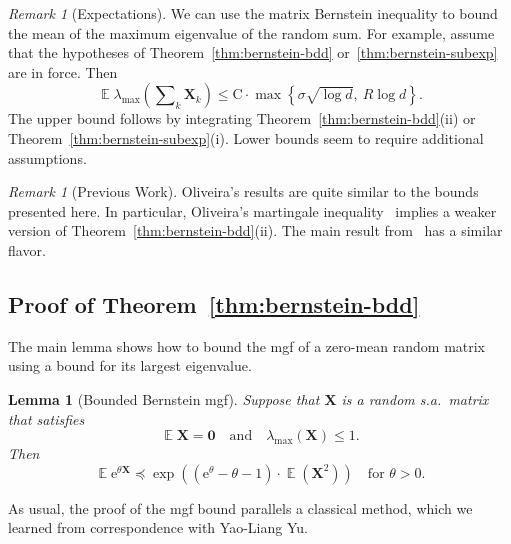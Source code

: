 \documentclass[11pt,letterpaper,twoside,reqno,draft]{amsart}
\newtheorem{lemma}[thm]{Lemma}
\theoremstyle{remark}
\newtheorem{rem}[thm]{Remark}
\numberwithin{equation}{section}
\numberwithin{thm}{section}
\begin{document}
\begin{rem}[Expectations]
We can use the matrix Bernstein inequality to bound the mean of the maximum eigenvalue of the random sum.  For example, assume that the hypotheses of Theorem~\ref{thm:bernstein-bdd} or~\ref{thm:bernstein-subexp} are in force.  Then 
\begin{equation} \label{eqn:bernstein-mean}
{\operatorname{\mathbb{E}}} \lambda_{\max}\left( \sum\nolimits_k {\bm{{X}}}_k \right)
	\leq {\mathrm{{C}}} \cdot \max\left\{ \sigma \sqrt{\log d}, \ R \log d \right\}.
\end{equation}
The upper bound follows by integrating Theorem~\ref{thm:bernstein-bdd}(ii) or Theorem~\ref{thm:bernstein-subexp}(i).  Lower bounds seem to require additional assumptions.
\end{rem}

\begin{rem}[Previous Work]

Oliveira's results are quite similar to the bounds presented here.  In particular, Oliveira's martingale inequality~\cite[Thm.~1.2]{Oli10:Concentration-Adjacency} implies a weaker version of Theorem~\ref{thm:bernstein-bdd}(ii).  The main result from~\cite{Oli10:Sums-Random} has a similar flavor.

\end{rem}

\subsection{Proof of Theorem~\ref{thm:bernstein-bdd}}

The main lemma shows how to bound the mgf of a zero-mean random matrix using a bound for its largest eigenvalue.

\begin{lemma}[Bounded Bernstein mgf] \label{lem:bernstein-bdd-mgf}
Suppose that ${\bm{{X}}}$ is a random s.a.~matrix that satisfies
$$
{\operatorname{\mathbb{E}}} {\bm{{X}}} = {\bm{{0}}}
\quad\text{and}\quad
\lambda_{\max}({\bm{{X}}}) \leq 1.
$$
Then
$$
{\operatorname{\mathbb{E}}} {\mathrm{e}}^{\theta {\bm{{X}}}}
	{\preccurlyeq} \exp\left( ({\mathrm{e}}^{\theta} - \theta - 1)
	\cdot {\operatorname{\mathbb{E}}}({\bm{{X}}}^2) \right)
\quad\text{for $\theta > 0$.}
$$
\end{lemma}

As usual, the proof of the mgf bound parallels a classical method, which we learned from correspondence with Yao-Liang Yu.
\end{document}

